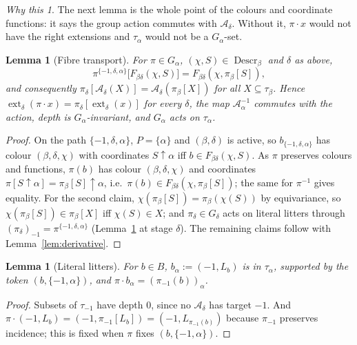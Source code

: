 \documentclass[11pt]{article}
\newtheorem{lemma}[theorem]{Lemma}
\theoremstyle{definition}
\theoremstyle{remark}
\newtheorem*{idea}{Why this}
\newcommand{\ext}{\operatorname{ext}}
\newcommand{\Descr}{\operatorname{Descr}}
\newcommand{\calA}{\mathcal A}
\newcommand{\up}{\!\uparrow\!}
\begin{document}
\begin{idea}
The next lemma is the whole point of the colours and coordinate functions:
it says the group action commutes with \(\calA_\delta\). Without it,
\(\pi\cdot x\) would not have the right extensions and \(\tau_\alpha\)
would not be a \(G_\alpha\)-set.
\end{idea}

\begin{lemma}[Fibre transport]\label{lem:transport}
For \(\pi\in G_\alpha\), \((\chi,S)\in\Descr_\beta\) and \(\delta\) as
above,
\[
 \pi^{\{-1,\delta,\alpha\}}\bigl[F_{\beta\delta}(\chi,S)\bigr]
 =F_{\beta\delta}(\chi,\pi_\beta[S]),
\]
and consequently \(\pi_\delta[\calA_\delta(X)]=\calA_\delta(\pi_\beta[X])\)
for all \(X\subseteq\tau_\beta\). Hence \(\ext_\delta(\pi\cdot x)=
\pi_\delta[\ext_\delta(x)]\) for every \(\delta\), the map
\(\calA^{-1}_\alpha\) commutes with the action, depth is
\(G_\alpha\)-invariant, and \(G_\alpha\) acts on \(\tau_\alpha\).
\end{lemma}
\begin{proof}
On the path \(\{-1,\delta,\alpha\}\), \(P=\{\alpha\}\) and \((\beta,
\delta)\) is active, so \(b_{\{-1,\delta,\alpha\}}\) has colour \((\beta,
\delta,\chi)\) with coordinates \(S\up\alpha\) iff \(b\in F_{\beta\delta}
(\chi,S)\). As \(\pi\) preserves colours and functions, \(\pi(b)\) has
colour \((\beta,\delta,\chi)\) and coordinates \(\pi[S\up\alpha]=
\pi_\beta[S]\up\alpha\), i.e.\ \(\pi(b)\in F_{\beta\delta}(\chi,\pi_\beta
[S])\); the same for \(\pi^{-1}\) gives equality. For the second claim,
\(\chi(\pi_\beta[S])=\pi_\beta(\chi(S))\) by equivariance, so
\(\chi(\pi_\beta[S])\in\pi_\beta[X]\) iff \(\chi(S)\in X\); and
\(\pi_\delta\in G_\delta\) acts on literal litters through
\((\pi_\delta)_{-1}=\pi^{\{-1,\delta,\alpha\}}\)
(Lemma~\ref{lem:literal} at stage \(\delta\)). The remaining claims follow
with Lemma~\ref{lem:derivative}.
\end{proof}

\begin{lemma}[Literal litters]\label{lem:literal}
For \(b\in B\), \(b_\alpha:=(-1,L_b)\) is in \(\tau_\alpha\), supported by
the token \((b,\{-1,\alpha\})\), and \(\pi\cdot b_\alpha=(\pi_{-1}(b))_
\alpha\).
\end{lemma}
\begin{proof}
Subsets of \(\tau_{-1}\) have depth \(0\), since no \(\calA_\delta\) has
target \(-1\). And \(\pi\cdot(-1,L_b)=(-1,\pi_{-1}[L_b])=(-1,L_{\pi_{-1}
(b)})\) because \(\pi_{-1}\) preserves incidence; this is fixed when
\(\pi\) fixes \((b,\{-1,\alpha\})\).
\end{proof}
\end{document}

